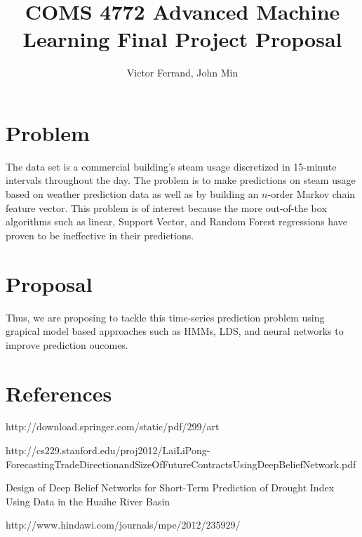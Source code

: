 \documentclass{article}
\author{Victor Ferrand, John Min}
\title{COMS 4772 Advanced Machine Learning Final Project Proposal}
\begin{document}
\maketitle

\section{Problem}
The data set is a commercial building's steam usage discretized in 15-minute intervals throughout the day.  The problem is to make predictions on steam usage based on weather prediction data as well as by building an $n$-order Markov chain feature vector.  This problem is of interest because the more out-of-the box algorithms such as linear, Support Vector, and Random Forest regressions have proven to be ineffective in their predictions.

\section{Proposal}
Thus, we are proposing to tackle this time-series prediction problem using grapical model based approaches such as HMMs, LDS, and neural networks to improve prediction oucomes.


\section{References}





http://download.springer.com/static/pdf/299/art%

http://cs229.stanford.edu/proj2012/LaiLiPong-ForecastingTradeDirectionandSizeOfFutureContractsUsingDeepBeliefNetwork.pdf



Design of Deep Belief Networks for Short-Term Prediction of Drought Index Using Data in the Huaihe River Basin

http://www.hindawi.com/journals/mpe/2012/235929/
\end{document}
